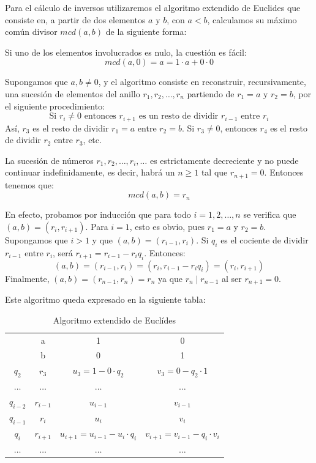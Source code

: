 \begin{definition}
    Para el cálculo de inversos utilizaremos el algoritmo extendido de Euclides que consiste en, a partir de dos elementos $a$ y $b$, con $a < b$, calculamos su máximo común divisor $mcd(a, b)$ de la siguiente forma:

    Si uno de los elementos involucrados es nulo, la cuestión es fácil:
    $$mcd(a, 0) = a = 1 \cdot a + 0 \cdot 0$$

    Supongamos que $a, b \neq 0$, y el algoritmo consiste en reconstruir, recursivamente, una sucesión de elementos del anillo $r_{1}, r_{2}, \dots, r_{n}$ partiendo de $r_{1} = a$ y $r_{2} = b$, por el siguiente procedimiento:
    $$\text{Si } r_{i} \neq 0 \text{ entonces } r_{i+1} \text{ es un resto de dividir } r_{i-1} \text{ entre } r_{i}$$
    Así, $r_{3}$ es el resto de dividir $r_{1} = a$ entre $r_{2} = b$. Si $r_{3} \neq 0$, entonces $r_{4}$ es el resto de dividir $r_{2}$ entre $r_{3}$, etc.

    La sucesión de números $r_{1}, r_{2}, \dots, r_{i}, \dots$ es estrictamente decreciente y no puede continuar indefinidamente, es decir, habrá un $n \geq 1$ tal que $r_{n+1} = 0$. Entonces tenemos que:
    $$mcd(a, b) = r_{n}$$

    En efecto, probamos por inducción que para todo $i = 1, 2, \dots, n$ se verifica que $(a, b) = (r_{i}, r_{i+1})$. Para $i = 1$, esto es obvio, pues $r_{1} = a$ y $r_{2} = b$. Supongamos que $i > 1$ y que $(a, b) = (r_{i-1}, r_{i})$. Si $q_{i}$ es el cociente de dividir $r_{i-1}$ entre $r_{i}$, será $r_{i+1} = r_{i-1} - r_{i}q_{i}$. Entonces:
    $$(a, b) = (r_{i-1}, r_{i}) = (r_{i}, r_{i-1} - r_{i}q_{i}) = (r_{i}, r_{i+1})$$
    Finalmente, $(a, b) = (r_{n-1}, r_{n}) = r_{n}$ ya que $r_{n} \mid r_{n-1}$ al ser $r_{n+1} = 0$.

    Este algoritmo queda expresado en la siguiente tabla:
    \begin{table}[H]
        \centering
        \begin{tabular}{c c|c c}
             & a & 1 & 0 \\
             & b & 0 & 1 \\
             $q_{2}$ & $r_{3}$ & $u_{3} = 1 - 0 \cdot q_{2}$ & $v_{3} = 0 - q_{2} \cdot 1$ \\
             $\dots$ & $\dots$ & $\dots$ & $\dots$ \\
             $q_{i-2}$ & $r_{i-1}$ & $u_{i-1}$ & $v_{i-1}$ \\
             $q_{i-1}$ & $r_{i}$ & $u_{i}$ & $v_{i}$ \\
             $q_{i}$ & $r_{i+1}$ & $u_{i+1} = u_{i-1} - u_{i} \cdot q_{i}$ & $v_{i+1} = v_{i-1} - q_{i} \cdot v_{i}$ \\
             $\dots$ & $\dots$ & $\dots$ & $\dots$ \\
        \end{tabular}
        \caption{Algoritmo extendido de Euclídes}
    \end{table}
\end{definition}

